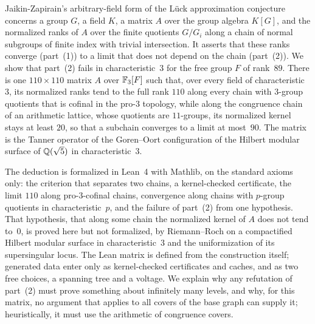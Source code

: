 Jaikin-Zapirain's arbitrary-field form of the L\"uck approximation conjecture concerns a group $G$, a field $K$, a
matrix $A$ over the group algebra $K[G]$, and the normalized ranks of $A$ over the finite quotients $G/G_i$ along a chain
of normal subgroups of finite index with trivial intersection. It asserts that these ranks converge (part~(1)) to a
limit that does not depend on the chain (part~(2)). We show that part~(2) fails in characteristic~$3$ for the free group
$F$ of rank~$89$. There is one $110\times110$ matrix $A$ over $\mathbb{F}_3[F]$ such that, over every field of characteristic~$3$,
its normalized ranks tend to the full rank $110$ along every chain with $3$-group quotients that is cofinal in the pro-$3$
topology, while along the congruence chain of an arithmetic lattice, whose quotients are $11$-groups, its normalized
kernel stays at least $20$, so that a subchain converges to a limit at most~$90$. The matrix is the Tanner operator of the
Goren--Oort configuration of the Hilbert modular surface of $\mathbb{Q}(\sqrt5)$ in characteristic~$3$.

The deduction is formalized in Lean~4 with Mathlib, on the standard axioms only: the criterion that separates two chains,
a kernel-checked certificate, the limit $110$ along pro-$3$-cofinal chains, convergence along chains with $p$-group
quotients in characteristic~$p$, and the failure of part~(2) from one hypothesis. That hypothesis, that along some chain
the normalized kernel of $A$ does not tend to~$0$, is proved here but not formalized, by Riemann--Roch on a compactified
Hilbert modular surface in characteristic~$3$ and the uniformization of its supersingular locus. The Lean matrix is
defined from the construction itself; generated data enter only as kernel-checked certificates and caches, and as two
free choices, a spanning tree and a voltage. We explain why any refutation
of part~(2) must prove something about infinitely many levels, and why, for this matrix, no argument that applies to all
covers of the base graph can supply it; heuristically, it must use the arithmetic of congruence covers.
